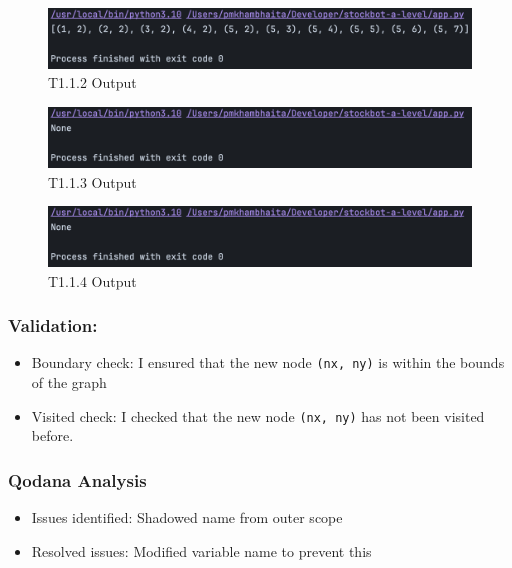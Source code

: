 \begin{figure}[htbp!]
    \centering
    \includegraphics[width=1\linewidth]{Images/t1.2.png}
    \caption{T1.1.2 Output}
    \label{fig:enter-label}
\end{figure}

\begin{figure}[htbp!]
    \centering
    \includegraphics[width=1\linewidth]{Images/t1.3,1.4.png}
    \caption{T1.1.3 Output}
    \label{fig:enter-label}
\end{figure}

\begin{figure}[htbp!]
    \centering
    \includegraphics[width=1\linewidth]{Images/t1.3,1.4.png}
    \caption{T1.1.4 Output}
    \label{fig:enter-label}
\end{figure}

\newpage

\subsubsection{Validation:}
\begin{itemize}
    \item Boundary check: I ensured that the new node \verb|(nx, ny)| is within the bounds of the graph
    \item Visited check: I checked that the new node \verb|(nx, ny)| has not been visited before.
\end{itemize}

\subsubsection{Qodana Analysis}
    \begin{itemize}
        \item Issues identified: Shadowed name from outer scope
        \item Resolved issues: Modified variable name to prevent this
    \end{itemize}

